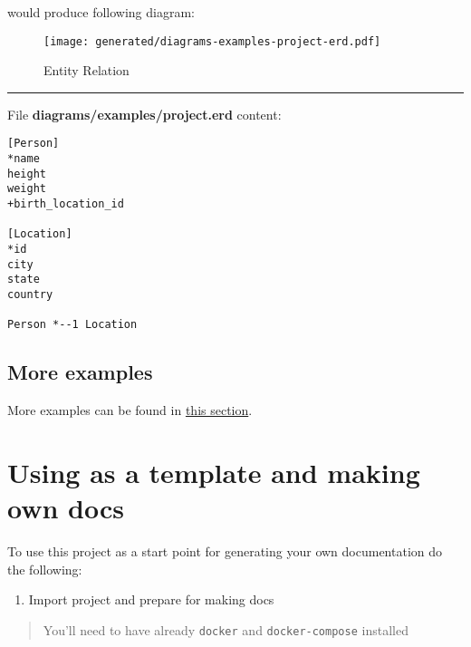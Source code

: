 \documentclass[12pt,a4paper,12pt,oneside,openany]{book}
\providecommand{\tightlist}{%
  \setlength{\itemsep}{0pt}\setlength{\parskip}{0pt}}
\begin{document}
would produce following diagram:

\begin{figure}
\centering
\texttt{[image: generated/diagrams-examples-project-erd.pdf]}
\caption{Entity Relation}
\end{figure}

\begin{center}\rule{0.5\linewidth}{\linethickness}\end{center}

File \textbf{diagrams/examples/project.erd} content:

\begin{verbatim}
[Person]
*name
height
weight
+birth_location_id

[Location]
*id
city
state
country

Person *--1 Location
\end{verbatim}

\section{More examples}\label{more-examples}

More examples can be found in \protect\hyperlink{examplesKroki}{this section}.

\hypertarget{as_template}{\chapter{Using as a template and making own docs}\label{as_template}}

To use this project as a start point for generating your own documentation do the following:

\begin{enumerate}
\def\labelenumi{\arabic{enumi}.}
\tightlist
\item
  Import project and prepare for making docs
\end{enumerate}

\begin{quote}
You'll need to have already \texttt{docker} and \texttt{docker-compose} installed
\end{quote}
\end{document}
